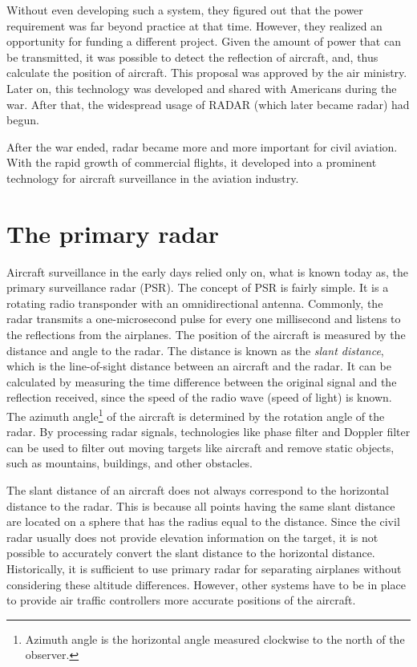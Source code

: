 Without even developing such a system, they figured out that the power requirement was far beyond practice at that time. However, they realized an opportunity for funding a different project. Given the amount of power that can be transmitted, it was possible to detect the reflection of aircraft, and, thus calculate the position of aircraft. This proposal was approved by the air ministry. Later on, this technology was developed and shared with Americans during the war. After that, the widespread usage of RADAR (which later became radar) had begun.

After the war ended, radar became more and more important for civil aviation. With the rapid growth of commercial flights, it developed into a prominent technology for aircraft surveillance in the aviation industry.

\section{The primary radar}

Aircraft surveillance in the early days relied only on, what is known today as, the primary surveillance radar (PSR). The concept of PSR is fairly simple. It is a rotating radio transponder with an omnidirectional antenna. Commonly, the radar transmits a one-microsecond pulse for every one millisecond and listens to the reflections from the airplanes. The position of the aircraft is measured by the distance and angle to the radar. The distance is known as the \emph{slant distance}, which is the line-of-sight distance between an aircraft and the radar. It can be calculated by measuring the time difference between the original signal and the reflection received, since the speed of the radio wave (speed of light) is known. The azimuth angle\footnote{Azimuth angle is the horizontal angle measured clockwise to the north of the observer.} of the aircraft is determined by the rotation angle of the radar. By processing radar signals, technologies like phase filter and Doppler filter can be used to filter out moving targets like aircraft and remove static objects, such as mountains, buildings, and other obstacles.

The slant distance of an aircraft does not always correspond to the horizontal distance to the radar. This is because all points having the same slant distance are located on a sphere that has the radius equal to the distance. Since the civil radar usually does not provide elevation information on the target, it is not possible to accurately convert the slant distance to the horizontal distance. Historically, it is sufficient to use primary radar for separating airplanes without considering these altitude differences. However, other systems have to be in place to provide air traffic controllers more accurate positions of the aircraft.


